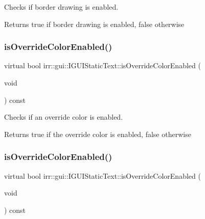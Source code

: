 Checks if border drawing is enabled. 

\begin{DoxyReturn}{Returns}
true if border drawing is enabled, false otherwise 
\end{DoxyReturn}
\mbox{\label{classirr_1_1gui_1_1IGUIStaticText_a67b17803b8ad73e8d687b23ad38db37e}} 
\subsubsection{\texorpdfstring{is\+Override\+Color\+Enabled()}{isOverrideColorEnabled()}\hspace{0.1cm}{\footnotesize\ttfamily [1/2]}}
{\footnotesize\ttfamily virtual bool irr\+::gui\+::\+I\+G\+U\+I\+Static\+Text\+::is\+Override\+Color\+Enabled (\begin{DoxyParamCaption}\item[{void}]{ }\end{DoxyParamCaption}) const\hspace{0.3cm}{\ttfamily [pure virtual]}}



Checks if an override color is enabled. 

\begin{DoxyReturn}{Returns}
true if the override color is enabled, false otherwise 
\end{DoxyReturn}
\mbox{\label{classirr_1_1gui_1_1IGUIStaticText_a67b17803b8ad73e8d687b23ad38db37e}} 
\subsubsection{\texorpdfstring{is\+Override\+Color\+Enabled()}{isOverrideColorEnabled()}\hspace{0.1cm}{\footnotesize\ttfamily [2/2]}}
{\footnotesize\ttfamily virtual bool irr\+::gui\+::\+I\+G\+U\+I\+Static\+Text\+::is\+Override\+Color\+Enabled (\begin{DoxyParamCaption}\item[{void}]{ }\end{DoxyParamCaption}) const\hspace{0.3cm}{\ttfamily [pure virtual]}}




